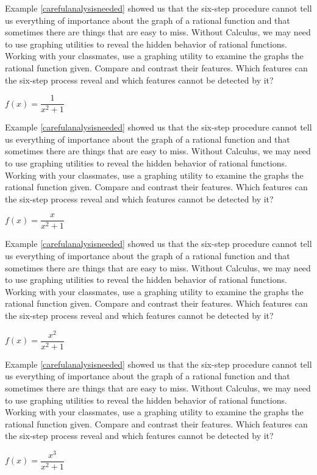 \documentclass{ximera}
\begin{document}
\begin{question} %
Example \ref{carefulanalysisneeded} showed us that the six-step procedure cannot tell us everything of importance about the graph of a rational function and that sometimes there are things that are easy to miss.  Without Calculus, we may need to use graphing utilities to reveal the hidden behavior of rational functions.  Working with your classmates, use a graphing utility to examine the graphs the rational function given.  Compare and contrast their features.  Which features can the six-step process reveal and which features cannot be detected by it?   

$f(x) = \dfrac{1}{x^{2} + 1}$
\end{question} %

\begin{question} %
Example \ref{carefulanalysisneeded} showed us that the six-step procedure cannot tell us everything of importance about the graph of a rational function and that sometimes there are things that are easy to miss.  Without Calculus, we may need to use graphing utilities to reveal the hidden behavior of rational functions.  Working with your classmates, use a graphing utility to examine the graphs the rational function given.  Compare and contrast their features.  Which features can the six-step process reveal and which features cannot be detected by it?   

$f(x) = \dfrac{x}{x^{2} + 1}$ 
\end{question} %

\begin{question} %
Example \ref{carefulanalysisneeded} showed us that the six-step procedure cannot tell us everything of importance about the graph of a rational function and that sometimes there are things that are easy to miss.  Without Calculus, we may need to use graphing utilities to reveal the hidden behavior of rational functions.  Working with your classmates, use a graphing utility to examine the graphs the rational function given.  Compare and contrast their features.  Which features can the six-step process reveal and which features cannot be detected by it?  

$f(x) = \dfrac{x^{2}}{x^{2} + 1}$ 
\end{question} %

\begin{question} %
Example \ref{carefulanalysisneeded} showed us that the six-step procedure cannot tell us everything of importance about the graph of a rational function and that sometimes there are things that are easy to miss.  Without Calculus, we may need to use graphing utilities to reveal the hidden behavior of rational functions.  Working with your classmates, use a graphing utility to examine the graphs the rational function given.  Compare and contrast their features.  Which features can the six-step process reveal and which features cannot be detected by it?   

$f(x) = \dfrac{x^{3}}{x^{2} + 1}$
\end{question} %
\end{document}
